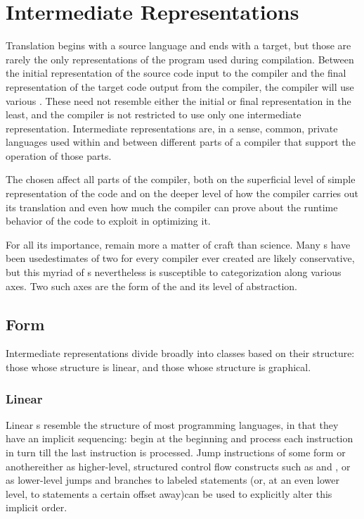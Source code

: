 \section{Intermediate Representations}\label{background:compilers:irs}
Translation begins with a source language and ends with a target, but those are rarely the only representations of the program used during compilation. Between the initial representation of the source code input to the compiler and the final representation of the target code output from the compiler, the compiler will use various . These need not resemble either the initial or final representation in the least, and the compiler is not restricted to use only one intermediate representation. Intermediate representations are, in a sense, common, private languages used within and between different parts of a compiler that support the operation of those parts.

The \IRs chosen affect all parts of the compiler, both on the superficial level of simple representation of the code and on the deeper level of how the compiler carries out its translation and even how much the compiler can prove about the runtime behavior of the code to exploit in optimizing it.

For all its importance, \IRs remain more a matter of craft than science. Many s have been used\empause estimates of two for every compiler ever created are likely conservative\empause , but this myriad of s nevertheless is susceptible to categorization along various axes. Two such axes are the form of the \IR and its level of abstraction.

\subsection{Form}
Intermediate representations divide broadly into classes based on their structure: those whose structure is linear, and those whose structure is graphical.

\subsubsection{Linear}
Linear s resemble the structure of most programming languages, in that they have an implicit sequencing: begin at the beginning and process each instruction in turn till the last instruction is processed. Jump instructions of some form or another\empause either as higher-level, structured control flow constructs such as  and , or as lower-level jumps and branches to labeled statements (or, at an even lower level, to statements a certain offset away)\empause can be used to explicitly alter this implicit order.

